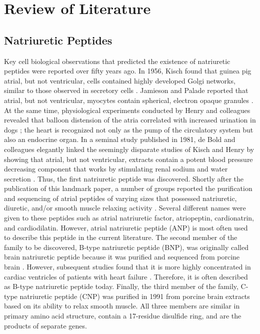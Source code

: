 \documentclass[14pt,a4paper,onecolumn]{extarticle}
\begin{document}
\section{Review of Literature}

\subsection{Natriuretic Peptides}


Key cell biological observations that predicted the existence of natriuretic peptides were reported over fifty years ago. In 1956, Kisch found that guinea pig atrial, but not ventricular, cells contained highly developed Golgi networks, similar to those observed in secretory cells \citep{Kisch1956}. Jamieson and Palade reported that atrial, but not ventricular, myocytes contain spherical, electron opaque granules \citep{Jamieson1964}. At the same time, physiological experiments conducted by Henry and colleagues revealed that balloon distension of the atria correlated with increased urination in dogs \citep{Henry1956}; the heart is recognized not only as the pump of the circulatory system but also an endocrine organ\citep{deBold1979}.
In a seminal study published in 1981, de Bold and colleagues elegantly linked the seemingly disparate studies of Kisch and Henry by showing that atrial, but not ventricular, extracts contain a potent blood pressure decreasing component that works by stimulating renal sodium and water secretion \citep{deBold1981}. Thus, the first natriuretic peptide was discovered. Shortly after the publication of this landmark paper, a number of groups reported the purification and sequencing of atrial peptides of varying sizes that possessed natriuretic, diuretic, and/or smooth muscle relaxing activity \citep{Currie1984}  \citep{Flynn1983} \citep{Kangawa1984} \citep{Misono1984}.
 Several different names were given to these peptides such as atrial natriuretic factor, atriopeptin, cardionatrin, and cardiodilatin. However, atrial natriuretic peptide (ANP) is most often used to describe this peptide in the current literature. The second member of the family to be discovered, B-type natriuretic peptide (BNP), was originally called brain natriuretic peptide because it was purified and sequenced from porcine brain \citep{Sudoh1988}. However, subsequent studies found that it is more highly concentrated in cardiac ventricles of patients with heart failure \citep{Mukoyama1991}  \citep{Mukoyama1990}. Therefore, it is often described as B-type natriuretic peptide today. Finally, the third member of the family, C-type natriuretic peptide (CNP) \citep{Sudoh1990} was purified in 1991 from porcine brain extracts based on its ability to relax smooth muscle. All three members are similar in primary amino acid structure, contain a 17-residue disulfide ring, and are the products of separate genes.
\end{document}
